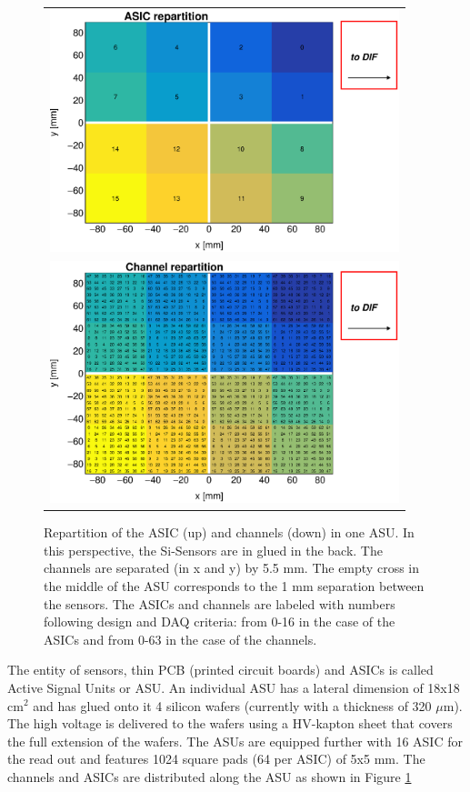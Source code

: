 \documentclass[a4paper,11pt]{article}
\begin{document}
\begin{figure}[!t]
  \centering
  \begin{tabular}{l}
    \includegraphics[width=4in]{figs/ASU_geometry1.eps}  \\
    \includegraphics[width=4in]{figs/ASU_geometry2.eps}  \\
  \end{tabular}
  \caption{Repartition of the ASIC (up) and channels (down) in one ASU. In this perspective, the Si-Sensors are in glued in the back.
    The channels are separated (in x and y) by 5.5 mm.
    The empty cross in the middle of the ASU corresponds to the 1 mm separation between the sensors.
    The ASICs and channels
    are labeled with numbers following design and DAQ criteria: from 0-16 in the case of the ASICs and from 0-63 in the case of the channels.
  }
\label{ASU}
\end{figure}

The entity
of sensors, thin PCB (printed circuit boards) and ASICs is called Active Signal Units or ASU.
An individual ASU has a lateral dimension of 18x18 cm$^{2}$ and has glued onto it 4 silicon wafers (currently with a thickness of 320 $\mu$m). The high voltage is delivered to the wafers using a HV-kapton sheet that covers the full extension of the wafers.
The ASUs are equipped
further with 16 ASIC for the read out and features 1024 square pads (64 per ASIC) of 5x5 mm.
The channels and ASICs are distributed along the ASU as shown in Figure \ref{ASU}
\end{document}
